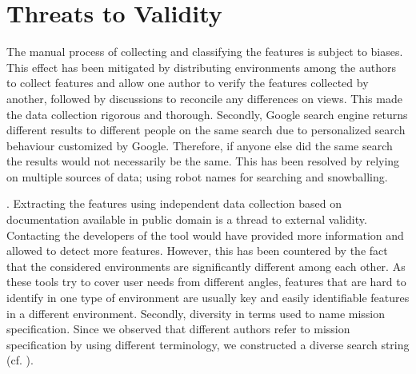 \section{Threats to Validity}
The manual process of collecting and classifying  the features is subject to biases.
This effect has been mitigated by distributing environments among the authors to collect features and allow one author to verify the features collected by another, followed by discussions to reconcile any differences on views. This made the data collection rigorous and thorough. Secondly, Google search engine returns different results to different people on the same search due to personalized search behaviour customized by Google. Therefore, if anyone else did the same search the results would not necessarily be the same. This has been resolved by relying on multiple sources of data; using robot names for searching and snowballing.

. Extracting the features using independent data collection based on documentation available in public domain is a thread to external validity. Contacting the developers of the tool would have provided more information and allowed to detect more features. 
However, this has been countered by the fact that the considered environments are significantly different among each other. As these tools try to cover user needs from different angles, features that are hard to identify in one type of environment are usually key and easily identifiable features in a different environment.
Secondly, diversity in terms used to name mission specification. Since we observed that different authors refer to mission specification by using different terminology, we constructed a diverse search string (cf. ).
